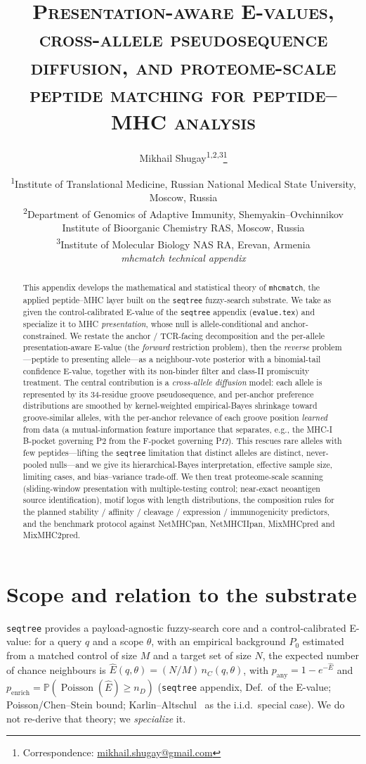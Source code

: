 \documentclass[11pt]{article}
\title{\scshape Presentation-aware E-values, cross-allele pseudosequence diffusion, and
proteome-scale peptide matching for peptide--MHC analysis}
\author{Mikhail Shugay\textsuperscript{1,2,3}\thanks{Correspondence:
  \href{mailto:mikhail.shugay@gmail.com}{mikhail.shugay@gmail.com}}}
\date{%
  \small
  \textsuperscript{1}Institute of Translational Medicine, Russian National Medical State University, Moscow, Russia\\
  \textsuperscript{2}Department of Genomics of Adaptive Immunity, Shemyakin--Ovchinnikov Institute of Bioorganic Chemistry RAS, Moscow, Russia\\
  \textsuperscript{3}Institute of Molecular Biology NAS RA, Erevan, Armenia\\[6pt]
  \normalsize\textit{mhcmatch technical appendix}%
}
\theoremstyle{oldplain}
\theoremstyle{oldrem}
\DeclareMathOperator{\Poisson}{Poisson}
\newcommand{\Pzero}{P_{0}}
\newcommand{\Prob}{\mathbb{P}}
\begin{document}
\maketitle

\begin{abstract}
This appendix develops the mathematical and statistical theory of \texttt{mhcmatch}, the applied
peptide--MHC layer built on the \texttt{seqtree} fuzzy-search substrate. We take as given the
control-calibrated E-value of the \texttt{seqtree} appendix (\texttt{evalue.tex}) and specialize it
to MHC \emph{presentation}, whose null is allele-conditional and anchor-constrained. We restate the
anchor / TCR-facing decomposition and the per-allele presentation-aware E-value (the \emph{forward}
restriction problem), then the \emph{reverse} problem---peptide to presenting allele---as a
neighbour-vote posterior with a binomial-tail confidence E-value, together with its non-binder
filter and class-II promiscuity treatment. The central contribution is a \emph{cross-allele
diffusion} model: each allele is represented by its 34-residue groove pseudosequence, and per-anchor
preference distributions are smoothed by kernel-weighted empirical-Bayes shrinkage toward
groove-similar alleles, with the per-anchor relevance of each groove position \emph{learned} from
data (a mutual-information feature importance that separates, e.g., the MHC-I B-pocket governing P2
from the F-pocket governing P$\Omega$). This rescues rare alleles with few peptides---lifting the
\texttt{seqtree} limitation that distinct alleles are distinct, never-pooled nulls---and we give its
hierarchical-Bayes interpretation, effective sample size, limiting cases, and bias--variance
trade-off. We then treat proteome-scale scanning (sliding-window presentation with multiple-testing
control; near-exact neoantigen source identification), motif logos with length distributions, the
composition rules for the planned stability / affinity / cleavage / expression / immunogenicity
predictors, and the benchmark protocol against NetMHCpan, NetMHCIIpan, MixMHCpred and MixMHC2pred.
\end{abstract}

\section{Scope and relation to the substrate}\label{sec:scope}
\texttt{seqtree} provides a payload-agnostic fuzzy-search core and a control-calibrated E-value: for
a query $q$ and a scope $\theta$, with an empirical background $\Pzero$ estimated from a matched
control of size $M$ and a target set of size $N$, the expected number of chance neighbours is
$\widehat E(q,\theta)=(N/M)\,n_C(q,\theta)$, with $p_{\mathrm{any}}=1-e^{-\widehat E}$ and
$p_{\mathrm{enrich}}=\Prob(\Poisson(\widehat E)\ge n_D)$ (\texttt{seqtree} appendix, Def.\ of the
E-value; Poisson/Chen--Stein bound; Karlin--Altschul~\cite{Karlin1990,Altschul1990} as the
i.i.d.\ special case). We do not re-derive that theory; we \emph{specialize} it.
\end{document}
